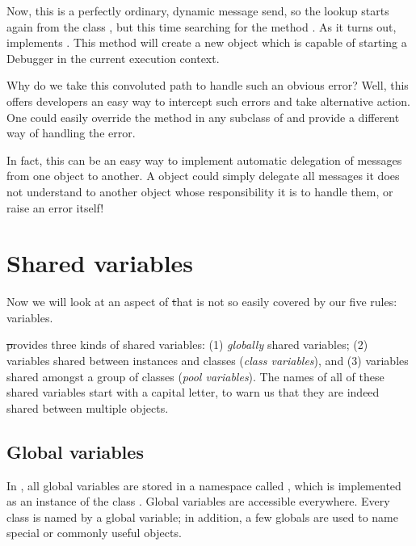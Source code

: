 \documentclass[a4paper,10pt,twoside]{book}
\begin{document}
Now, this is a perfectly ordinary, dynamic message send, so the lookup starts again from the class , but this time searching for the method .
As it turns out,  implements .
This method will create a new  object which is capable of starting a Debugger in the current execution context.

Why do we take this convoluted path to handle such an obvious error?
Well, this offers developers an easy way to intercept such errors and take alternative action.
One could easily override the method  in any subclass of  and  provide a different way of handling the error.

In fact, this can be an easy way to implement automatic delegation of messages from one object to another.
A  object could simply delegate all messages it does not understand to another object whose responsibility it is to handle them, or raise an error itself!

\section{Shared variables}

Now we will look at an aspect of \st that is not so easily covered by our five rules:  variables.

\st provides three kinds of shared variables: (1) \emph{globally} shared variables; (2) variables shared between instances and classes (\emph{class variables}), and (3) variables shared amongst a group of  classes (\emph{pool variables}).  The names of all of these shared variables start with a capital letter, to warn us that they are indeed shared between multiple objects.

\subsection{Global variables}
In \pharo, all global variables are stored in a namespace called , which is implemented as an instance of the class .
Global variables are accessible everywhere. 
Every class is named by a global variable; in addition, a few globals are used to name special or commonly useful objects.
\end{document}
